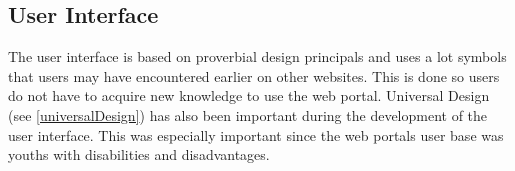 \subsection{User Interface}
The user interface is based on proverbial design principals and uses a lot symbols that users may have encountered earlier on other websites. This is done so users do not have to acquire new knowledge to use the web portal. Universal Design (see \ref{universalDesign}) has also been important during the development of the user interface. This was especially important since the web portals user base was youths with disabilities and disadvantages. 
\cleardoublepage